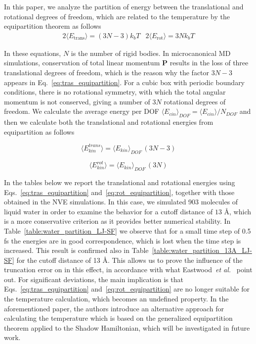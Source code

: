 \documentclass[aip,jcp,reprint,amsmath,amssymb,raggedbottom]{revtex4-1}
\begin{document}
In this paper, we analyze the partition of energy between the translational and rotational degrees of freedom, which are related to the temperature by the equipartition theorem as follows
\begin{subequations}
\begin{align}
\label{eq:tras_equipartition}
2 \langle E_\text{trans} \rangle = (3N - 3) k_b T
\end{align}
\begin{align}
\label{eq:rot_equipartition}
2 \langle E_\text{rot} \rangle = 3N k_b T
\end{align} 
\end{subequations}

In these equations, $N$ is the number of rigid bodies. In microcanonical MD simulations, conservation of total linear momentum $\boldsymbol{P}$ results in the loss of three translational degrees of freedom, which is the reason why the factor $3N-3$ appears in Eq.~\ref{eq:tras_equipartition}. For a cubic box with periodic boundary conditions, there is no rotational symmetry,\cite{Frenkel_2013, Kuzkin_2014} with which the total angular momentum is not conserved, giving a number of $3N$ rotational degrees of freedom. We calculate the average energy per DOF $\langle E_{cin} \rangle_{DOF} = \langle E_{cin} \rangle /N_{DOF}$ and then we calculate both the translational and rotational energies from equipartition as follows

\begin{equation}
\langle E_{kin}^{trans}\rangle =  \langle E_{kin} \rangle_{DOF} \, (3N-3)
\end{equation}

\begin{equation}
\langle E_{kin}^{rot} \rangle =  \langle E_{kin} \rangle_{DOF} \, (3N)
\end{equation}

In the tables below we report the translational and rotational energies using Eqs.~\ref{eq:tras_equipartition} and~\ref{eq:rot_equipartition}, together with those obtained in the NVE simulations. In this case, we simulated 903 molecules of liquid water in order to examine the behavior for a cutoff distance of $13$ {\AA}, which is a more conservative criterion as it provides better numerical stability. In Table~\ref{table:water_partition_LJ-SF} we observe that for a small time step of 0.5 fs the energies are in good correspondence, which is lost when the time step is increased. This result is confirmed also in Table~\ref{table:water_partition_13A_LJ-SF} for the cutoff distance of 13 {\AA}. This allows us to prove the influence of the truncation error on in this effect, in accordance with what Eastwood~\textit{et al.}~\cite{Eastwood_2010} point out. For significant deviations, the main implication is that Eqs.~\ref{eq:tras_equipartition} and~\ref{eq:rot_equipartition} are no longer suitable for the temperature calculation, which becomes an undefined property. In the aforementioned paper, the authors introduce an alternative approach for calculating the temperature which is based on the generalized equipartition theorem applied to the Shadow Hamiltonian, which will be investigated in future work.
\end{document}
